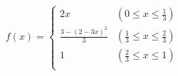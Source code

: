 \documentclass[a4d]{jarticle}
\begin{document}
\begin{eqnarray}
  f(x) = \left\{ \begin{array}{ll}
  2x & (0 \le x \le \frac{1}{3}) \\
  \frac{3 - (2 - 3x)^2}{3} & (\frac{1}{3} \le x \le \frac{2}{3}) \\
  1 & (\frac{2}{3} \le x \le 1) \\
\end{array} \right.
\end{eqnarray} 
\end{document}
